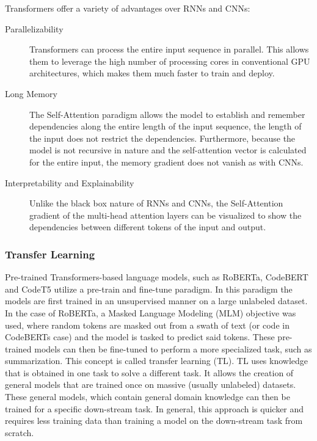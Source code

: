 Transformers offer a variety of advantages over RNNs and CNNs:
\begin{description}
    \item[Parallelizability] Transformers can process the entire input sequence in parallel. This allows them to leverage the high number of processing cores in conventional GPU architectures, which makes them much faster to train and deploy.
    \item[Long Memory] The Self-Attention paradigm allows the model to establish and remember dependencies along the entire length of the input sequence, the length of the input does not restrict the dependencies. Furthermore, because the model is not recursive in nature and the self-attention vector is calculated for the entire input, the memory gradient does not vanish as with CNNs.
    \item[Interpretability and Explainability] Unlike the black box nature of RNNs and CNNs, the Self-Attention gradient of the multi-head attention layers can be visualized to show the dependencies between different tokens of the input and output.
\end{description}

\subsubsection{Transfer Learning}
Pre-trained Transformers-based language models, such as RoBERTa, CodeBERT \cite{CodeBERT} and CodeT5 \cite{CodeT5} utilize a pre-train and fine-tune paradigm. In this paradigm the models are first trained in an unsupervised manner on a large unlabeled dataset. In the case of RoBERTa, a Masked Language Modeling (MLM) objective was used, where random tokens are masked out from a swath of text (or code in CodeBERTs case) and the model is tasked to predict said tokens. These pre-trained models can then be fine-tuned to perform a more specialized task, such as summarization. This concept is called transfer learning (TL). 
TL uses knowledge that is obtained in one task to solve a different task. It allows the creation of general models that are trained once on massive (usually unlabeled) datasets. These general models, which contain general domain knowledge can then be trained for a specific down-stream task. In general, this approach is quicker and requires less training data than training a model on the down-stream task from scratch\cite{BERT}.

